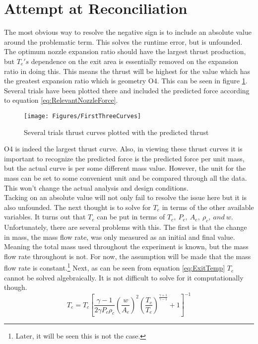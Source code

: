 \section{Attempt at Reconciliation}
The most obvious way to resolve the negative sign is to include an absolute value around the problematic term. This solves the runtime error, but is unfounded. The optimum nozzle expansion ratio should have the largest thrust production, but  $T_e's$ dependence on the exit area is essentially removed on the expansion ratio in doing this. This means the thrust will be highest for the value which has the greatest expansion ratio which is geometry O4. This can be seen in figure \ref{fig:FirstThreeCurves}. Several trials have been plotted there and included the predicted force according to equation \ref{eq:RelevantNozzleForce}.
\begin{figure}[h!]
\centering
\texttt{[image: Figures/FirstThreeCurves]}
\caption{Several trials thrust curves plotted with the predicted thrust}
\label{fig:FirstThreeCurves}
\end{figure}
O4 is indeed the largest thrust curve. Also, in viewing these thrust curves it is important to recognize the predicted force is the predicted force per unit mass, but the actual curve is per some different mass value. However, the unit for the mass can be set to some convenient unit and be compared through all the data. This won't change the actual analysis and design conditions.\\
Tacking on an absolute value will not only fail to resolve the issue here but it is also unfounded. The next thought is to solve for $T_e$ in terms of the other available variables. It turns out that $T_e$ can be put in terms of $T_c,\ P_c,\ A_e,\ \rho_c,\ and\ w$. Unfortunately, there are several problems with this. The first is that the change in mass, the mass flow rate, was only measured as an initial and final value. Meaning the total mass used throughout the experiment is known, but the mass flow rate throughout is not. For now, the assumption will be made that the mass flow rate is constant.\footnote{Later, it will be seen this is not the case.} Next, as can be seen from equation \ref{eq:ExitTemp} $T_e$ cannot be solved algebraically. It is not difficult to solve for it computationally though. 
\begin{equation}\label{eq:ExitTemp}
T_e = T_c\left[\frac{\gamma -1}{2\gamma P_c \rho_c} \left(\frac{w}{A_e}\right)^2\left(\frac{T_c}{T_e}\right)^{\frac{\gamma+1}{\gamma-1}}+1\right]^{-1}
\end{equation}
